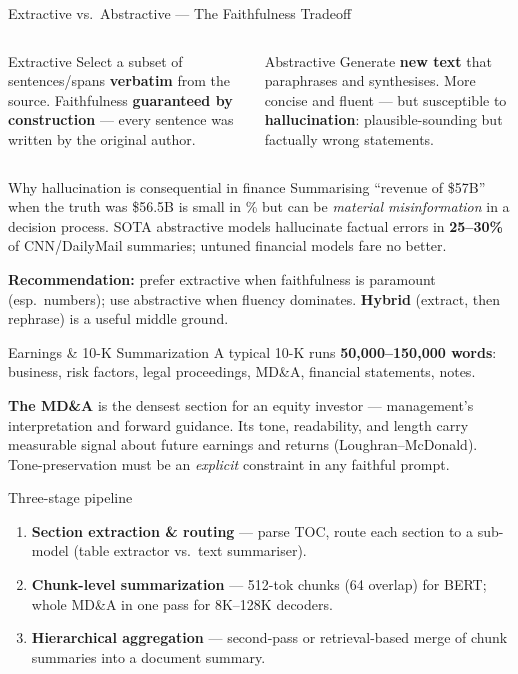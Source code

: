 \documentclass[9pt,t]{beamer}
\begin{document}
\begin{frame}{Extractive vs.\ Abstractive --- The Faithfulness Tradeoff}
\begin{columns}[T]
\begin{block}{Extractive}
Select a subset of sentences/spans \textbf{verbatim} from the source.
Faithfulness \textbf{guaranteed by construction} --- every sentence was written by
the original author.
\end{block}
\begin{block}{Abstractive}
Generate \textbf{new text} that paraphrases and synthesises. More concise and
fluent --- but susceptible to \textbf{hallucination}: plausible-sounding but
factually wrong statements.
\end{block}
\end{columns}

\medskip
\begin{alertblock}{Why hallucination is consequential in finance}
Summarising ``revenue of \$57B'' when the truth was \$56.5B is small in \% but can
be \emph{material misinformation} in a decision process. SOTA abstractive models
hallucinate factual errors in \textbf{25--30\%} of CNN/DailyMail summaries; untuned
financial models fare no better.
\end{alertblock}

\medskip
\textbf{Recommendation:} prefer extractive when faithfulness is paramount
(esp.\ numbers); use abstractive when fluency dominates. \textbf{Hybrid} (extract,
then rephrase) is a useful middle ground.
\end{frame}

\begin{frame}{Earnings \& 10-K Summarization}
A typical 10-K runs \textbf{50{,}000--150{,}000 words}: business, risk factors,
legal proceedings, MD\&A, financial statements, notes.

\medskip
\textbf{The MD\&A} is the densest section for an equity investor --- management's
interpretation and forward guidance. Its tone, readability, and length carry
measurable signal about future earnings and returns (Loughran--McDonald).
Tone-preservation must be an \emph{explicit} constraint in any faithful prompt.

\medskip
\begin{block}{Three-stage pipeline}
\begin{enumerate}
  \item \textbf{Section extraction \& routing} --- parse TOC, route each section to
        a sub-model (table extractor vs.\ text summariser).
  \item \textbf{Chunk-level summarization} --- 512-tok chunks (64 overlap) for BERT;
        whole MD\&A in one pass for 8K--128K decoders.
  \item \textbf{Hierarchical aggregation} --- second-pass or retrieval-based merge of
        chunk summaries into a document summary.
\end{enumerate}
\end{block}
\end{frame}
\end{document}
